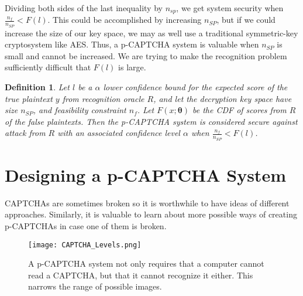 \documentclass[12pt]{article}
\newtheorem{mydef}{Definition}
\begin{document}
Dividing both sides of the last inequality by $n_{sp}$, we get system security when $\frac{n_f}{n_{SP}} < F(l)$. This could be accomplished by increasing $n_{SP}$, but if we could increase the size of our key space, we may as well use a traditional symmetric-key cryptosystem like AES. Thus, a p-CAPTCHA system is valuable when $n_{SP}$ is small and cannot be increased. We are trying to make the recognition problem sufficiently difficult that $F(l)$ is large.

\begin{mydef}
Let $l$ be a $\alpha$ lower confidence bound for the expected score of the true plaintext $y$ from recognition oracle $R$, and let the decryption key space have size $n_{SP}$, and feasibility constraint $n_f$. Let $F(x; \mathbf{\theta})$ be the CDF of scores from $R$ of the false plaintexts. Then the p-CAPTCHA system is considered secure against attack from $R$ with an associated confidence level $\alpha$ when $\frac{n_f}{n_{SP}} < F(l)$.
\end{mydef}

\section*{Designing a p-CAPTCHA System}

CAPTCHAs are sometimes broken so it is worthwhile to have ideas of different approaches. Similarly, it is valuable to learn about more possible ways of creating p-CAPTCHAs in case one of them is broken. 

\begin{figure}
	\begin{center}
		\texttt{[image: CAPTCHA\_Levels.png]}
	\end{center}
	\caption{A p-CAPTCHA system not only requires that a computer cannot read a CAPTCHA, but that it cannot recognize it either. This narrows the range of possible images.}
\label{CAPTCHALevels}
\end{figure}



\end{document}
